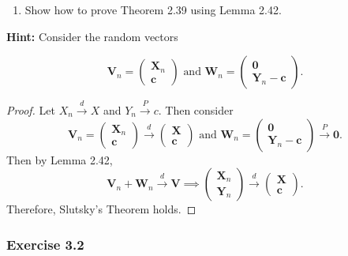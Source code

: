 \documentclass[12pt,]{article}
\providecommand{\tightlist}{%
  \setlength{\itemsep}{0pt}\setlength{\parskip}{0pt}}
\begin{document}
\newpage

\begin{enumerate}
\def\labelenumi{(\alph{enumi})}
\setcounter{enumi}{1}
\tightlist
\item
  Show how to prove Theorem 2.39 using Lemma 2.42.
\end{enumerate}

\textbf{Hint:} Consider the random vectors

\[\boldsymbol V_n = \begin{pmatrix} \boldsymbol X_n\\ \boldsymbol c\end{pmatrix} \text{ and } \boldsymbol W_n = \begin{pmatrix} \boldsymbol 0\\ \boldsymbol Y_n - \boldsymbol c\end{pmatrix}.\]

\begin{proof}
Let $X_n \overset{d}\rightarrow X$ and $Y_n\overset{P}\rightarrow c$. Then consider
$$\boldsymbol V_n = \begin{pmatrix} \boldsymbol X_n\\ \boldsymbol c\end{pmatrix} \overset{d}\rightarrow \begin{pmatrix} \boldsymbol X\\ \boldsymbol c\end{pmatrix} \text{ and } \boldsymbol W_n = \begin{pmatrix} \boldsymbol 0\\ \boldsymbol Y_n - \boldsymbol c\end{pmatrix}\overset{P}\rightarrow \boldsymbol 0.$$ Then by Lemma 2.42, $$\boldsymbol V_n + \boldsymbol W_n \overset{d} \rightarrow \boldsymbol V \implies \begin{pmatrix} \boldsymbol X_n\\ \boldsymbol Y_n\end{pmatrix} \overset{d}\rightarrow \begin{pmatrix} \boldsymbol X\\ \boldsymbol c\end{pmatrix}.$$ Therefore, Slutsky's Theorem holds.
\end{proof}

\hypertarget{exercise-3.2}{%
\subsubsection{Exercise 3.2}\label{exercise-3.2}}
\end{document}

